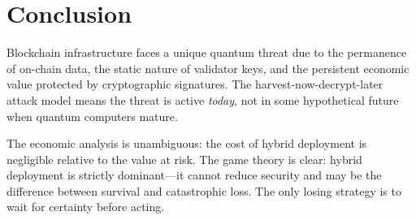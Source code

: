 \section{Conclusion}


Blockchain infrastructure faces a unique quantum threat due to the permanence of
on-chain data, the static nature of validator keys, and the persistent economic value
protected by cryptographic signatures. The harvest-now-decrypt-later attack model
means the threat is active \emph{today}, not in some hypothetical future when quantum
computers mature.

The economic analysis is unambiguous: the cost of hybrid deployment is negligible
relative to the value at risk. The game theory is clear: hybrid deployment is
strictly dominant---it cannot reduce security and may be the difference between
survival and catastrophic loss. The only losing strategy is to wait for certainty
before acting.

